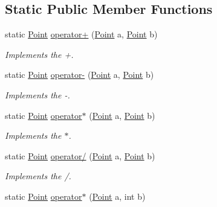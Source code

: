 \subsection*{Static Public Member Functions}
\begin{DoxyCompactItemize}
\item 
static \hyperlink{struct_lerp2_a_p_i_1_1_optimizers_1_1_point}{Point} \hyperlink{struct_lerp2_a_p_i_1_1_optimizers_1_1_point_a0b19fb34522b22ddaa2e4e867e165555}{operator+} (\hyperlink{struct_lerp2_a_p_i_1_1_optimizers_1_1_point}{Point} a, \hyperlink{struct_lerp2_a_p_i_1_1_optimizers_1_1_point}{Point} b)
\begin{DoxyCompactList}\small\item\em Implements the +. \end{DoxyCompactList}\item 
static \hyperlink{struct_lerp2_a_p_i_1_1_optimizers_1_1_point}{Point} \hyperlink{struct_lerp2_a_p_i_1_1_optimizers_1_1_point_a166b0ec397e9dba06f03a3ebb4c3217f}{operator-\/} (\hyperlink{struct_lerp2_a_p_i_1_1_optimizers_1_1_point}{Point} a, \hyperlink{struct_lerp2_a_p_i_1_1_optimizers_1_1_point}{Point} b)
\begin{DoxyCompactList}\small\item\em Implements the -\/. \end{DoxyCompactList}\item 
static \hyperlink{struct_lerp2_a_p_i_1_1_optimizers_1_1_point}{Point} \hyperlink{struct_lerp2_a_p_i_1_1_optimizers_1_1_point_a91abfb466d803983aa737c0966607935}{operator$\ast$} (\hyperlink{struct_lerp2_a_p_i_1_1_optimizers_1_1_point}{Point} a, \hyperlink{struct_lerp2_a_p_i_1_1_optimizers_1_1_point}{Point} b)
\begin{DoxyCompactList}\small\item\em Implements the $\ast$. \end{DoxyCompactList}\item 
static \hyperlink{struct_lerp2_a_p_i_1_1_optimizers_1_1_point}{Point} \hyperlink{struct_lerp2_a_p_i_1_1_optimizers_1_1_point_abecde15fa8399e61cea353ac050a0968}{operator/} (\hyperlink{struct_lerp2_a_p_i_1_1_optimizers_1_1_point}{Point} a, \hyperlink{struct_lerp2_a_p_i_1_1_optimizers_1_1_point}{Point} b)
\begin{DoxyCompactList}\small\item\em Implements the /. \end{DoxyCompactList}\item 
static \hyperlink{struct_lerp2_a_p_i_1_1_optimizers_1_1_point}{Point} \hyperlink{struct_lerp2_a_p_i_1_1_optimizers_1_1_point_a8f20033c1c8b2033fb24eea4f3f4500c}{operator$\ast$} (\hyperlink{struct_lerp2_a_p_i_1_1_optimizers_1_1_point}{Point} a, int b)

\end{DoxyCompactItemize}

